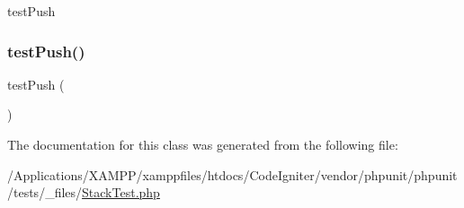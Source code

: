 test\+Push \mbox{\label{class_stack_test_a3c0a5103a2837b7c310175aacb9fd4d9}} 
\subsubsection{\texorpdfstring{test\+Push()}{testPush()}}
{\footnotesize\ttfamily test\+Push (\begin{DoxyParamCaption}{ }\end{DoxyParamCaption})}



The documentation for this class was generated from the following file\+:\begin{DoxyCompactItemize}
\item 
/\+Applications/\+X\+A\+M\+P\+P/xamppfiles/htdocs/\+Code\+Igniter/vendor/phpunit/phpunit/tests/\+\_\+files/\mbox{\hyperlink{_stack_test_8php}{Stack\+Test.\+php}}\end{DoxyCompactItemize}
